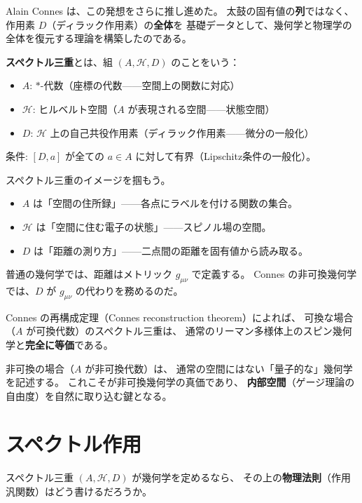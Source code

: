 \documentclass[11pt,a4paper]{article}
\theoremstyle{definition}
\begin{document}
Alain Connes は、この発想をさらに推し進めた。
太鼓の固有値の\textbf{列}ではなく、作用素 $D$（ディラック作用素）の\textbf{全体}を
基礎データとして、幾何学と物理学の全体を復元する理論を構築したのである。

\begin{dfnbox}
\textbf{スペクトル三重}とは、組 $(A, \mathcal{H}, D)$ のことをいう：
\begin{itemize}
  \item $A$: $*$-代数（座標の代数——空間上の関数に対応）
  \item $\mathcal{H}$: ヒルベルト空間（$A$ が表現される空間——状態空間）
  \item $D$: $\mathcal{H}$ 上の自己共役作用素（ディラック作用素——微分の一般化）
\end{itemize}
条件: $[D, a]$ が全ての $a\in A$ に対して有界（Lipschitz条件の一般化）。
\end{dfnbox}

\begin{hsbox}
スペクトル三重のイメージを掴もう。
\begin{itemize}
  \item $A$ は「空間の住所録」——各点にラベルを付ける関数の集合。
  \item $\mathcal{H}$ は「空間に住む電子の状態」——スピノル場の空間。
  \item $D$ は「距離の測り方」——二点間の距離を固有値から読み取る。
\end{itemize}
普通の幾何学では、距離はメトリック $g_{\mu\nu}$ で定義する。
Connes の非可換幾何学では、$D$ が $g_{\mu\nu}$ の代わりを務めるのだ。
\end{hsbox}

Connes の再構成定理（Connes reconstruction theorem）によれば、
可換な場合（$A$ が可換代数）のスペクトル三重は、
通常のリーマン多様体上のスピン幾何学と\textbf{完全に等価}である。

非可換の場合（$A$ が非可換代数）は、
通常の空間にはない「量子的な」幾何学を記述する。
これこそが非可換幾何学の真価であり、
\textbf{内部空間}（ゲージ理論の自由度）を自然に取り込む鍵となる。

\section{スペクトル作用}
\label{sec:3.2}

スペクトル三重 $(A, \mathcal{H}, D)$ が幾何学を定めるなら、
その上の\textbf{物理法則}（作用汎関数）はどう書けるだろうか。
\end{document}
